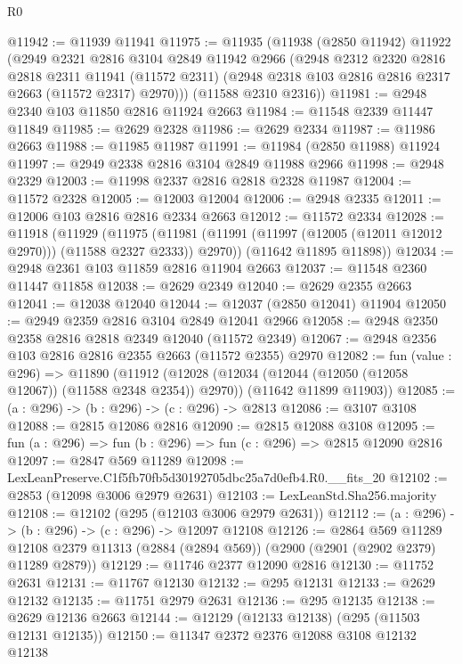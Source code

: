 \begin{lexlean}{R0}
\begin{coremodule}
@11942 := @11939 @11941
@11975 := @11935
    (@11938
      (@2850 @11942)
      @11922
      (@2949
        @2321
        @2816
        @3104
        @2849
        @11942
        @2966
        (@2948
          @2312
          @2320
          @2816
          @2818
          @2311
          @11941
          (@11572 @2311)
          (@2948 @2318 @103 @2816 @2816 @2317 @2663 (@11572 @2317) @2970)))
      (@11588 @2310 @2316))
@11981 := @2948 @2340 @103 @11850 @2816 @11924 @2663
@11984 := @11548 @2339 @11447 @11849
@11985 := @2629 @2328
@11986 := @2629 @2334
@11987 := @11986 @2663
@11988 := @11985 @11987
@11991 := @11984 (@2850 @11988) @11924
@11997 := @2949 @2338 @2816 @3104 @2849 @11988 @2966
@11998 := @2948 @2329
@12003 := @11998 @2337 @2816 @2818 @2328 @11987
@12004 := @11572 @2328
@12005 := @12003 @12004
@12006 := @2948 @2335
@12011 := @12006 @103 @2816 @2816 @2334 @2663
@12012 := @11572 @2334
@12028 := @11918
    (@11929
      (@11975 (@11981 (@11991 (@11997 (@12005 (@12011 @12012 @2970))) (@11588 @2327 @2333)) @2970))
      (@11642 @11895 @11898))
@12034 := @2948 @2361 @103 @11859 @2816 @11904 @2663
@12037 := @11548 @2360 @11447 @11858
@12038 := @2629 @2349
@12040 := @2629 @2355 @2663
@12041 := @12038 @12040
@12044 := @12037 (@2850 @12041) @11904
@12050 := @2949 @2359 @2816 @3104 @2849 @12041 @2966
@12058 := @2948 @2350 @2358 @2816 @2818 @2349 @12040 (@11572 @2349)
@12067 := @2948 @2356 @103 @2816 @2816 @2355 @2663 (@11572 @2355) @2970
@12082 := fun (value : @296) =>
  @11890
    (@11912
      (@12028 (@12034 (@12044 (@12050 (@12058 @12067)) (@11588 @2348 @2354)) @2970))
      (@11642 @11899 @11903))
@12085 := (a : @296) -> (b : @296) -> (c : @296) -> @2813
@12086 := @3107 @3108
@12088 := @2815 @12086 @2816
@12090 := @2815 @12088 @3108
@12095 := fun (a : @296) => fun (b : @296) => fun (c : @296) => @2815 @12090 @2816
@12097 := @2847 @569 @11289
@12098 := LexLeanPreserve.C1f5fb70fb5d30192705dbc25a7d0efb4.R0.__fits_20
@12102 := @2853 (@12098 @3006 @2979 @2631)
@12103 := LexLeanStd.Sha256.majority
@12108 := @12102 (@295 (@12103 @3006 @2979 @2631))
@12112 := (a : @296) -> (b : @296) -> (c : @296) -> @12097 @12108
@12126 := @2864
    @569
    @11289
    @12108
    @2379
    @11313
    (@2884 (@2894 @569))
    (@2900 (@2901 (@2902 @2379) @11289 @2879))
@12129 := @11746 @2377 @12090 @2816
@12130 := @11752 @2631
@12131 := @11767 @12130
@12132 := @295 @12131
@12133 := @2629 @12132
@12135 := @11751 @2979 @2631
@12136 := @295 @12135
@12138 := @2629 @12136 @2663
@12144 := @12129 (@12133 @12138) (@295 (@11503 @12131 @12135))
@12150 := @11347 @2372 @2376 @12088 @3108 @12132 @12138

\end{coremodule}
\end{lexlean}
